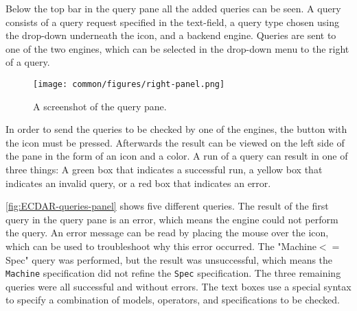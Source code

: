 Below the top bar in the query pane all the added queries can be seen. A query consists of a query request specified in the text-field, a query type chosen using the drop-down underneath the icon, and a backend engine. 
Queries are sent to one of the two engines, which can be selected in the drop-down menu to the right of a query. 
\begin{figure}[H]
    \centering
    \texttt{[image: common/figures/right-panel.png]}
    \caption{A screenshot of the query pane.}
    \label{fig:ECDAR-queries-panel}
\end{figure}

In order to send the queries to be checked by one of the engines, the button with the  icon must be pressed.
Afterwards the result can be viewed on the left side of the pane in the form of an icon and a color.
A run of a query can result in one of three things: A green box that indicates a successful run, a yellow box that indicates an invalid query, or a red box that indicates an error.

\autoref{fig:ECDAR-queries-panel} shows five different queries. 
The result of the first query in the query pane is an error, which means the engine could not perform the query. 
An error message can be read by placing the mouse over the icon, which can be used to troubleshoot why this error occurred.
The "Machine$<=$Spec" query was performed, but the result was unsuccessful, which means the \texttt{Machine} specification did not refine the \texttt{Spec} specification.
The three remaining queries were all successful and without errors.
The text boxes use a special syntax to specify a combination of models, operators, and specifications to be checked.






